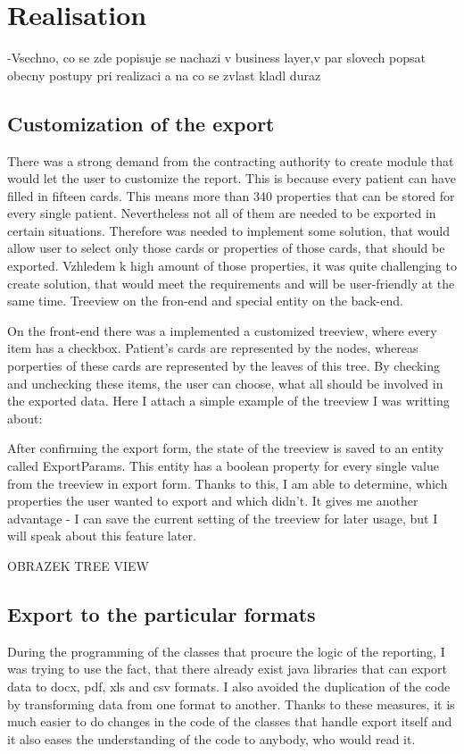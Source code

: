 \documentclass[thesis=B,english]{FITthesis}[2012/10/20]
\begin{document}
	\chapter{Realisation}
-Vsechno, co se zde popisuje se nachazi v business layer,v par slovech
popsat obecny postupy pri realizaci a na co se zvlast kladl duraz
\section{Customization of the export}
There was a strong demand from the contracting authority to create module that would  let the user to customize the report. This is because every patient can have filled in fifteen cards. This means more than 340 properties that can be stored for every single patient. Nevertheless not all of them are needed to be exported in certain situations. Therefore was needed to implement some solution, that would allow user to select only those cards or properties of those cards, that should be exported.
Vzhledem k high amount of those properties, it was quite challenging to create solution, that would meet the requirements and will be user-friendly at the same time. Treeview on the fron-end and special entity on the back-end.

On the front-end there was a implemented a customized treeview, where every item has a checkbox. Patient's cards are represented by the nodes, whereas porperties of these cards are represented by the leaves of this tree. By checking and unchecking these items, the user can choose, what all should be involved in the exported data.
Here I attach a simple example of the treeview I was writting about:



After confirming the export form, the state of the treeview is saved to an entity called ExportParams. This entity has a boolean property for every single value from the treeview in export form. Thanks to this, I am able to determine, which properties the user wanted to export and which didn't. It gives me another advantage - I can save the current setting of the treeview for later usage, but I will speak about this feature later.
 
OBRAZEK TREE VIEW
\section{Export to the particular formats}
During the  programming of the classes that procure the logic of the reporting, I was trying to use the fact, that there already exist java libraries that can export data to docx, pdf, xls and csv formats. I also avoided the duplication of the code by transforming data from one format to another. Thanks to these measures, it is much easier to do changes in the code of the classes that handle export itself and it also eases the understanding of the code to anybody, who would read it.
\end{document}
